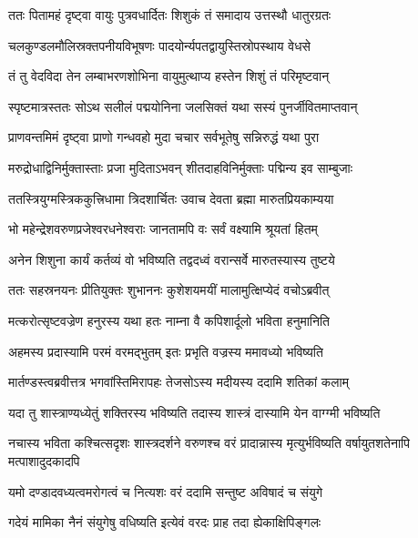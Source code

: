 
\twolineshloka
{ततः पितामहं दृष्ट्वा वायुः पुत्रवधार्दितः}
{शिशुकं तं समादाय उत्तस्थौ धातुरग्रतः} %

\twolineshloka
{चलकुण्डलमौलिस्रक्तपनीयविभूषणः}
{पादयोर्न्यपतद्वायुस्तिस्रोपस्थाय वेधसे} %

\twolineshloka
{तं तु वेदविदा तेन लम्बाभरणशोभिना}
{वायुमुत्थाप्य हस्तेन शिशुं तं परिमृष्टवान्} %

\twolineshloka
{स्पृष्टमात्रस्ततः सोऽथ सलीलं पद्मयोनिना}
{जलसिक्तं यथा सस्यं पुनर्जीवितमाप्तवान्} %

\twolineshloka
{प्राणवन्तमिमं दृष्ट्वा प्राणो गन्धवहो मुदा}
{चचार सर्वभूतेषु सन्निरुद्धं यथा पुरा} %

\twolineshloka
{मरुद्रोधाद्विनिर्मुक्तास्ताः प्रजा मुदिताऽभवन्}
{शीतदाहविनिर्मुक्ताः पद्मिन्य इव साम्बुजाः} %

\twolineshloka
{ततस्त्रियुग्मस्त्रिककुत्त्रिधामा त्रिदशार्चितः}
{उवाच देवता ब्रह्मा मारुतप्रियकाम्यया} %

\twolineshloka
{भो महेन्द्रेशवरुणप्रजेश्वरधनेश्वराः}
{जानतामपि वः सर्वं वक्ष्यामि श्रूयतां हितम्} %

\twolineshloka
{अनेन शिशुना कार्यं कर्तव्यं वो भविष्यति}
{तद्वदध्वं वरान्सर्वे मारुतस्यास्य तुष्टये} %

\twolineshloka
{ततः सहस्रनयनः प्रीतियुक्तः शुभाननः}
{कुशेशयमयीं मालामुत्क्षिप्येदं वचोऽब्रवीत्} %

\twolineshloka
{मत्करोत्सृष्टवज्रेण हनुरस्य यथा हतः}
{नाम्ना वै कपिशार्दूलो भविता हनुमानिति} %

\twolineshloka
{अहमस्य प्रदास्यामि परमं वरमद्भुतम्}
{इतः प्रभृति वज्रस्य ममावध्यो भविष्यति} %

\twolineshloka
{मार्तण्डस्त्वब्रवीत्तत्र भगवांस्तिमिरापहः}
{तेजसोऽस्य मदीयस्य ददामि शतिकां कलाम्} %

\twolineshloka
{यदा तु शास्त्राण्यध्येतुं शक्तिरस्य भविष्यति}
{तदास्य शास्त्रं दास्यामि येन वाग्ग्मी भविष्यति} %

\threelineshloka
{नचास्य भविता कश्चित्सदृशः शास्त्रदर्शने}
{वरुणश्च वरं प्रादान्नास्य मृत्युर्भविष्यति}
{वर्षायुतशतेनापि मत्पाशादुदकादपि} %

\twolineshloka
{यमो दण्डादवध्यत्वमरोगत्वं च नित्यशः}
{वरं ददामि सन्तुष्ट अविषादं च संयुगे} %

\twolineshloka
{गदेयं मामिका नैनं संयुगेषु वधिष्यति}
{इत्येवं वरदः प्राह तदा ह्येकाक्षिपिङ्गलः} %

